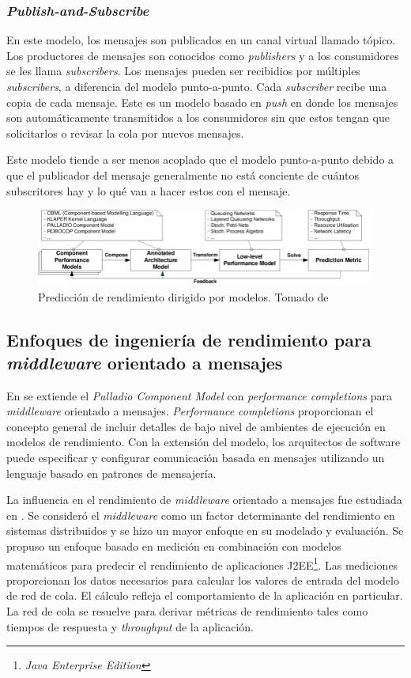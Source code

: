 \documentclass[11pt, twoside]{report}
\begin{document}
\subsubsection{\emph{Publish-and-Subscribe}}
En este modelo, los mensajes son publicados en un canal virtual llamado tópico. Los productores de mensajes son conocidos como \emph{publishers} y a los consumidores se les llama \emph{subscribers}. Los mensajes pueden ser recibidios por múltiples \emph{subscribers}, a diferencia del modelo punto-a-punto. Cada \emph{subscriber} recibe una copia de cada mensaje. Este es un modelo basado en \emph{push} en donde los mensajes son automáticamente transmitidos a los consumidores sin que estos tengan que solicitarlos o revisar la cola por nuevos mensajes. 

Este modelo tiende a ser menos acoplado que el modelo punto-a-punto debido a que el publicador del mensaje generalmente no está conciente de cuántos subscritores hay y lo qué van a hacer estos con el mensaje.


\begin{figure}[h]
  \centering
  \includegraphics[width=15cm]{model-driven-performance-prediction}
  \caption{\small{Predicción de rendimiento dirigido por modelos. Tomado de \cite{happe-et-al}}}
  \label{fig:model-driven-performance-prediction}
\end{figure}


\subsection{Enfoques de ingeniería de rendimiento para \emph{middleware} orientado a mensajes}
En \cite{happe-et-al} se extiende el \emph{Palladio Component Model} con \emph{performance completions} para \emph{middleware} orientado a mensajes. \emph{Performance completions}\cite{woodside-et-al-2} proporcionan el concepto general de incluir detalles de bajo nivel de ambientes de ejecución en modelos de rendimiento. Con la extensión del modelo, los arquitectos de software puede especificar y configurar comunicación basada en mensajes utilizando un lenguaje basado en patrones de mensajería.

La influencia en el rendimiento de \emph{middleware} orientado a mensajes fue estudiada en \cite{liu-gordon}. Se consideró el \emph{middleware} como un factor determinante del rendimiento en sistemas distribuidos y se hizo un mayor enfoque en su modelado y evaluación. Se propuso un enfoque basado en medición en combinación con modelos matemáticos para predecir el rendimiento de aplicaciones J2EE\footnote{\emph{Java Enterprise Edition}}. Las mediciones proporcionan los datos necesarios para calcular los valores de entrada del modelo de red de cola. El cálculo refleja el comportamiento de la aplicación en particular. La red de cola se resuelve para derivar métricas de rendimiento tales como tiempos de respuesta y \emph{throughput} de la aplicación. 
\end{document}
